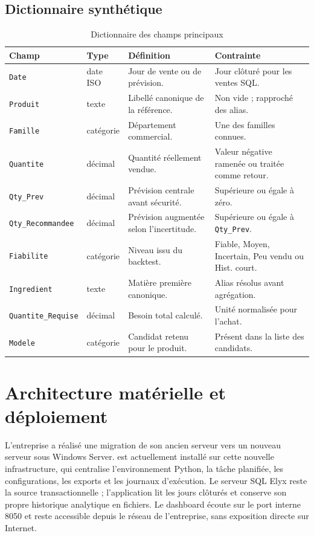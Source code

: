 \subsection{Dictionnaire synthétique}

\begin{table}[H]
\centering
\caption{Dictionnaire des champs principaux}
\label{tab:dictionnaire}
\small
\begin{tabularx}{\textwidth}{p{3.2cm}p{2.6cm}Yp{3.2cm}}
\toprule
\textbf{Champ} & \textbf{Type} & \textbf{Définition} & \textbf{Contrainte} \\
\midrule
\texttt{Date} & date ISO & Jour de vente ou de prévision. & Jour clôturé pour les ventes SQL. \\
\texttt{Produit} & texte & Libellé canonique de la référence. & Non vide ; rapproché des alias. \\
\texttt{Famille} & catégorie & Département commercial. & Une des familles connues. \\
\texttt{Quantite} & décimal & Quantité réellement vendue. & Valeur négative ramenée ou traitée comme retour. \\
\texttt{Qty\_Prev} & décimal & Prévision centrale avant sécurité. & Supérieure ou égale à zéro. \\
\texttt{Qty\_Recommandee} & décimal & Prévision augmentée selon l'incertitude. & Supérieure ou égale à \texttt{Qty\_Prev}. \\
\texttt{Fiabilite} & catégorie & Niveau issu du backtest. & Fiable, Moyen, Incertain, Peu vendu ou Hist. court. \\
\texttt{Ingredient} & texte & Matière première canonique. & Alias résolus avant agrégation. \\
\texttt{Quantite\_Requise} & décimal & Besoin total calculé. & Unité normalisée pour l'achat. \\
\texttt{Modele} & catégorie & Candidat retenu pour le produit. & Présent dans la liste des candidats. \\
\bottomrule
\end{tabularx}
\end{table}

\section{Architecture matérielle et déploiement}

L'entreprise a réalisé une migration de son ancien serveur vers un nouveau
serveur sous Windows Server. \NomProjet{} est actuellement installé sur cette
nouvelle infrastructure, qui centralise l'environnement Python, la tâche
planifiée, les configurations, les exports et les journaux d'exécution. Le serveur
SQL Elyx reste la source transactionnelle ; l'application lit les jours clôturés
et conserve son propre historique analytique en fichiers. Le dashboard écoute sur
le port interne 8050 et reste accessible depuis le réseau de l'entreprise, sans
exposition directe sur Internet.

